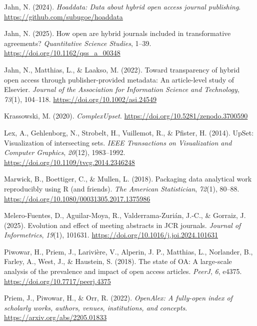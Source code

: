 \documentclass[a4paper,man,floatsintext,longtable,noextraspace,10pt]{apa6}
\newlength{\cslhangindent}
\newenvironment{CSLReferences}[2] %
{\begin{list}{}{%
  \setlength{\itemindent}{0pt}
  \setlength{\leftmargin}{0pt}
  \setlength{\parsep}{0pt}
  \ifodd #1
  \setlength{\leftmargin}{\cslhangindent}
  \setlength{\itemindent}{-1\cslhangindent}
  \fi
  \setlength{\itemsep}{#2\baselineskip}}}
{\end{list}}
\begin{document}
\begin{CSLReferences}{1}{0}
Jahn, N. (2024). \emph{Hoaddata: Data about hybrid open access journal
publishing}. \url{https://github.com/subugoe/hoaddata}

Jahn, N. (2025). How open are hybrid journals included in transformative
agreements? \emph{Quantitative Science Studies}, 1--39.
\url{https://doi.org/10.1162/qss_a_00348}

Jahn, N., Matthias, L., \& Laakso, M. (2022). Toward transparency of
hybrid open access through publisher-provided metadata: An article-level
study of {Elsevier}. \emph{Journal of the Association for Information
Science and Technology}, \emph{73}(1), 104--118.
\url{https://doi.org/10.1002/asi.24549}

Krassowski, M. (2020). \emph{ComplexUpset}.
\url{https://doi.org/10.5281/zenodo.3700590}

Lex, A., Gehlenborg, N., Strobelt, H., Vuillemot, R., \& Pfister, H.
(2014). UpSet: Visualization of intersecting sets. \emph{IEEE
Transactions on Visualization and Computer Graphics}, \emph{20}(12),
1983--1992. \url{https://doi.org/10.1109/tvcg.2014.2346248}

Marwick, B., Boettiger, C., \& Mullen, L. (2018). Packaging data
analytical work reproducibly using {R} (and friends). \emph{The American
Statistician}, \emph{72}(1), 80--88.
\url{https://doi.org/10.1080/00031305.2017.1375986}

Melero-Fuentes, D., Aguilar-Moya, R., Valderrama-Zurián, J.-C., \&
Gorraiz, J. (2025). Evolution and effect of meeting abstracts in JCR
journals. \emph{Journal of Informetrics}, \emph{19}(1), 101631.
\url{https://doi.org/10.1016/j.joi.2024.101631}

Piwowar, H., Priem, J., Larivière, V., Alperin, J. P., Matthias, L.,
Norlander, B., Farley, A., West, J., \& Haustein, S. (2018). The state
of {OA}: A large-scale analysis of the prevalence and impact of open
access articles. \emph{{PeerJ}}, \emph{6}, e4375.
\url{https://doi.org/10.7717/peerj.4375}

Priem, J., Piwowar, H., \& Orr, R. (2022). \emph{OpenAlex: A fully-open
index of scholarly works, authors, venues, institutions, and concepts}.
\url{https://arxiv.org/abs/2205.01833}


\end{CSLReferences}
\end{document}
